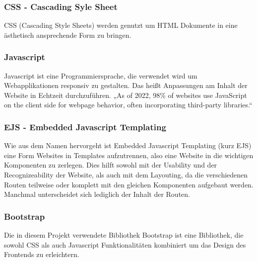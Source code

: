 \subsubsection{CSS - Cascading Syle Sheet}
CSS (Cascading Style Sheets) werden genutzt um HTML Dokumente in eine ästhetisch ansprechende Form zu bringen. 

\subsubsection{Javascript}
Javascript ist eine Programmiersprache, die verwendet wird um Webapplikationen responsiv zu gestalten. Das heißt Anpassungen am Inhalt der Website in Echtzeit durchzuführen. „As of 2022, 98\% of websites use JavaScript on the client side for webpage behavior, often incorporating third-party libraries.“ \cite{JavaScript}

\subsubsection{EJS - Embedded Javascript Templating}
Wie aus dem Namen hervorgeht ist Embedded Javascript Templating (kurz EJS) eine Form Websites in Templates aufzutrennen, also eine Website in die wichtigen Komponenten zu zerlegen. Dies hilft sowohl mit der Usability und der Recognizeability der Website, als auch mit dem Layouting, da die verschiedenen Routen teilweise oder komplett mit den gleichen Komponenten aufgebaut werden. Manchmal unterscheidet sich lediglich der Inhalt der Routen.

\subsubsection{Bootstrap}
Die in diesem Projekt verwendete Bibliothek Bootstrap ist eine Bibliothek, die sowohl CSS als auch Javascript Funktionalitäten kombiniert um das Design des Frontends zu erleichtern.


